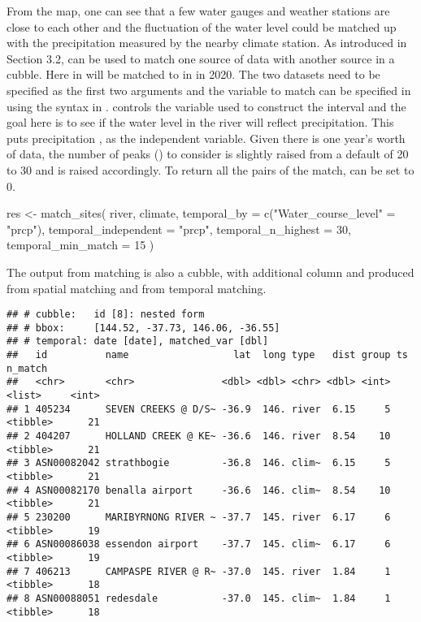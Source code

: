 \documentclass{article}
\newenvironment{Shaded}{\begin{snugshade}}{\end{snugshade}}
\newcommand{\AttributeTok}[1]{\textcolor[rgb]{0.77,0.63,0.00}{#1}}
\newcommand{\DecValTok}[1]{\textcolor[rgb]{0.00,0.00,0.81}{#1}}
\newcommand{\FunctionTok}[1]{\textcolor[rgb]{0.00,0.00,0.00}{#1}}
\newcommand{\NormalTok}[1]{#1}
\newcommand{\OtherTok}[1]{\textcolor[rgb]{0.56,0.35,0.01}{#1}}
\newcommand{\StringTok}[1]{\textcolor[rgb]{0.31,0.60,0.02}{#1}}
\begin{document}
From the map, one can see that a few water gauges and weather stations are close to each other and the fluctuation of the water level could be matched up with the precipitation measured by the nearby climate station. As introduced in Section 3.2,  can be used to match one source of data with another source in a cubble. Here  in  will be matched to  in  in 2020. The two datasets need to be specified as the first two arguments and the variable to match can be specified in  using the  syntax in .  controls the variable used to construct the interval and the goal here is to see if the water level in the river will reflect precipitation. This puts precipitation , as the independent variable. Given there is one year's worth of data, the number of peaks () to consider is slightly raised from a default of 20 to 30 and  is raised accordingly. To return all the pairs of the match,  can be set to 0.

\begin{Shaded}
\begin{Highlighting}[]
\NormalTok{res }\OtherTok{\textless{}{-}} \FunctionTok{match\_sites}\NormalTok{(}
\NormalTok{  river, climate,}
  \AttributeTok{temporal\_by =} \FunctionTok{c}\NormalTok{(}\StringTok{"Water\_course\_level"} \OtherTok{=} \StringTok{"prcp"}\NormalTok{),}
  \AttributeTok{temporal\_independent =} \StringTok{"prcp"}\NormalTok{,  }
  \AttributeTok{temporal\_n\_highest =} \DecValTok{30}\NormalTok{,}
  \AttributeTok{temporal\_min\_match =} \DecValTok{15}
\NormalTok{)}
\end{Highlighting}
\end{Shaded}

The output from matching is also a cubble, with additional column  and  produced from spatial matching and  from temporal matching.

\begin{verbatim}
## # cubble:   id [8]: nested form
## # bbox:     [144.52, -37.73, 146.06, -36.55]
## # temporal: date [date], matched_var [dbl]
##   id          name                  lat  long type   dist group ts       n_match
##   <chr>       <chr>               <dbl> <dbl> <chr> <dbl> <int> <list>     <int>
## 1 405234      SEVEN CREEKS @ D/S~ -36.9  146. river  6.15     5 <tibble>      21
## 2 404207      HOLLAND CREEK @ KE~ -36.6  146. river  8.54    10 <tibble>      21
## 3 ASN00082042 strathbogie         -36.8  146. clim~  6.15     5 <tibble>      21
## 4 ASN00082170 benalla airport     -36.6  146. clim~  8.54    10 <tibble>      21
## 5 230200      MARIBYRNONG RIVER ~ -37.7  145. river  6.17     6 <tibble>      19
## 6 ASN00086038 essendon airport    -37.7  145. clim~  6.17     6 <tibble>      19
## 7 406213      CAMPASPE RIVER @ R~ -37.0  145. river  1.84     1 <tibble>      18
## 8 ASN00088051 redesdale           -37.0  145. clim~  1.84     1 <tibble>      18
\end{verbatim}
\end{document}
